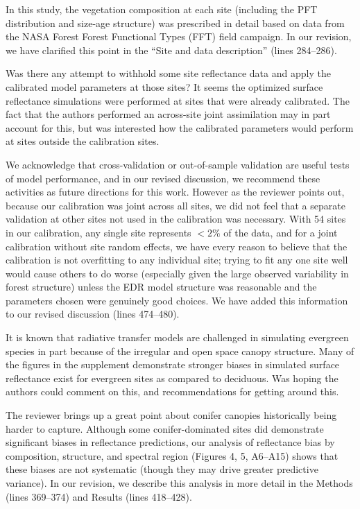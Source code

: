 In this study, the vegetation composition at each site (including the PFT distribution and size-age structure) was prescribed in detail based on data from the NASA Forest Forest Functional Types (FFT) field campaign.
In our revision, we have clarified this point in the ``Site and data description'' (lines 284--286).

\begin{reviewer}
  Was there any attempt to withhold some site reflectance data and apply the calibrated model parameters at those sites?
  It seems the optimized surface reflectance simulations were performed at sites that were already calibrated.
  The fact that the authors performed an across-site joint assimilation may in part account for this, but was interested how the calibrated parameters would perform at sites outside the calibration sites.
\end{reviewer}

We acknowledge that cross-validation or out-of-sample validation are useful tests of model performance, and in our revised discussion, we recommend these activities as future directions for this work.
However as the reviewer points out, because our calibration was joint across all sites, we did not feel that a separate validation at other sites not used in the calibration was necessary.
With 54 sites in our calibration, any single site represents $<2\%$ of the data, and for a joint calibration without site random effects, we have every reason to believe that the calibration is not overfitting to any individual site;
trying to fit any one site well would cause others to do worse (especially given the large observed variability in forest structure) unless the EDR model structure was reasonable and the parameters chosen were genuinely good choices.
We have added this information to our revised discussion (lines 474--480).

\begin{reviewer}
  It is known that radiative transfer models are challenged in simulating evergreen species in part because of the irregular and open space canopy structure.
  Many of the figures in the supplement demonstrate stronger biases in simulated surface reflectance exist for evergreen sites as compared to deciduous. Was hoping the authors could comment on this, and recommendations for getting around this.
\end{reviewer}

The reviewer brings up a great point about conifer canopies historically being harder to capture.
Although some conifer-dominated sites did demonstrate significant biases in reflectance predictions, our analysis of reflectance bias by composition, structure, and spectral region (Figures 4, 5, A6--A15) shows that these biases are not systematic (though they may drive greater predictive variance).
In our revision, we describe this analysis in more detail in the Methods (lines 369--374) and Results (lines 418--428).

